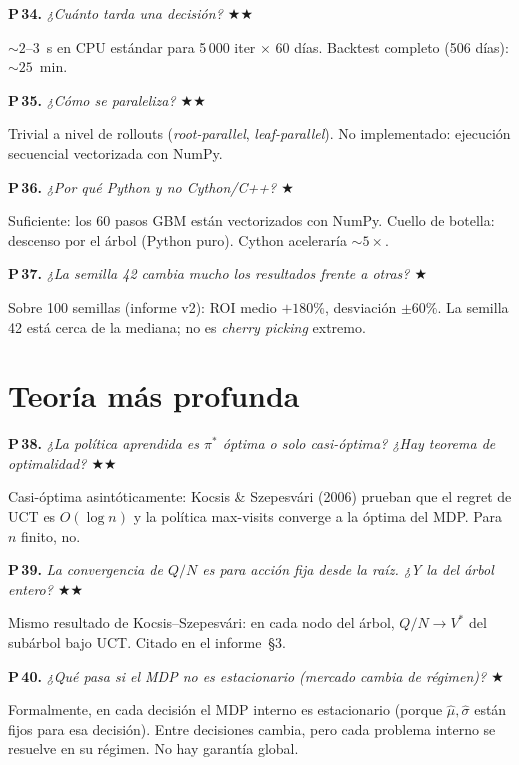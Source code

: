 \documentclass[11pt,a4paper]{article}
\newcommand{\preg}[2]{%
  \par\medskip
  \noindent\textbf{P\,#1.} \emph{#2}\par\smallskip}
\newcommand{\resp}[1]{%
  \noindent #1\par}
\begin{document}
\preg{34}{¿Cuánto tarda una decisión? \hfill$\bigstar\bigstar$}
\resp{%
${\sim}2$--$3$~s en CPU estándar para 5\,000 iter $\times$ 60 días.
Backtest completo (506 días): ${\sim}25$~min.}

\preg{35}{¿Cómo se paraleliza? \hfill$\bigstar\bigstar$}
\resp{%
Trivial a nivel de rollouts (\emph{root-parallel}, \emph{leaf-parallel}).
No implementado: ejecución secuencial vectorizada con NumPy.}

\preg{36}{¿Por qué Python y no Cython/C++? \hfill$\bigstar$}
\resp{%
Suficiente: los 60 pasos GBM están vectorizados con NumPy. Cuello de
botella: descenso por el árbol (Python puro). Cython aceleraría
${\sim}5\times$.}

\preg{37}{¿La semilla 42 cambia mucho los resultados frente a otras?
\hfill$\bigstar$}
\resp{%
Sobre 100 semillas (informe v2): ROI medio $+180\%$, desviación
$\pm 60\%$. La semilla 42 está cerca de la mediana; no es \emph{cherry
picking} extremo.}

\section{Teoría más profunda}

\preg{38}{¿La política aprendida es $\pi^*$ óptima o solo casi-óptima?
¿Hay teorema de optimalidad? \hfill$\bigstar\bigstar$}
\resp{%
Casi-óptima asintóticamente: Kocsis \& Szepesvári (2006) prueban que el
regret de UCT es $O(\log n)$ y la política max-visits converge a la
óptima del MDP. Para $n$ finito, no.}

\preg{39}{La convergencia de $Q/N$ es para acción fija desde la raíz.
¿Y la del árbol entero? \hfill$\bigstar\bigstar$}
\resp{%
Mismo resultado de Kocsis--Szepesvári: en cada nodo del árbol,
$Q/N\to V^*$ del subárbol bajo UCT. Citado en el informe~\S3.}

\preg{40}{¿Qué pasa si el MDP no es estacionario (mercado cambia de
régimen)? \hfill$\bigstar$}
\resp{%
Formalmente, en cada decisión el MDP interno es estacionario (porque
$\hat\mu,\hat\sigma$ están fijos para esa decisión). Entre decisiones
cambia, pero cada problema interno se resuelve en su régimen. No hay
garantía global.}
\end{document}
